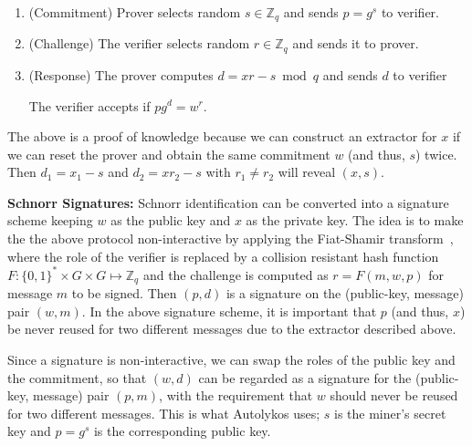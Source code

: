 \documentclass[runningheads]{llncs}
\newcommand{\powname}{Autolykos\xspace}
\begin{document}
\begin{enumerate}
	\item (Commitment) Prover selects random ${s}\in\mathbb{Z}_q$ and sends ${p} = g^{s}$ to verifier.
	\item (Challenge) The verifier selects random $r\in \mathbb{Z}_q$ and sends it to prover. 
	\item (Response) The prover computes $d = xr-{s} \bmod{q}$ and sends $d$ to verifier
	
	The verifier accepts if ${p}g^d = w^r$. 
	
\end{enumerate}

The above is a proof of knowledge because we can construct an extractor for $x$ if we can reset the prover and obtain the same commitment $w$ (and thus, $s$) twice. Then $d_1=x_1 - s$ and $d_2=xr_2-s$ with $r_1 \neq r_2$ will reveal $(x, s)$.

\textbf{Schnorr Signatures:}
Schnorr identification can be converted into a signature scheme keeping $w$ as the public key and $x$ as the private key. The idea is to make the the above protocol non-interactive by applying the Fiat-Shamir transform~\cite{fiatshamir}, where the role of the verifier is replaced by a collision resistant hash function 
$F:\{0,1\}^*\times G\times G\mapsto \mathbb{Z}_q$ and the challenge is computed as $r = F(m,w,{p})$ for message $m$ to be signed. Then $(p, d)$ is a signature on the (public-key, message) pair $(w, m)$. 
In the above signature scheme, it is important that $p$ (and thus, $x$) be never reused for two different messages due to the extractor described above. 

Since a signature is non-interactive, we can swap the roles of the public key and the commitment, so that $(w, d)$ can be regarded as a signature for the (public-key, message) pair $(p, m)$, with the requirement that $w$ should never be reused for two different messages. This is what \powname uses; ${s}$ is the miner's secret key and ${p} = g^{s}$ is the corresponding public key. 



\end{document}
